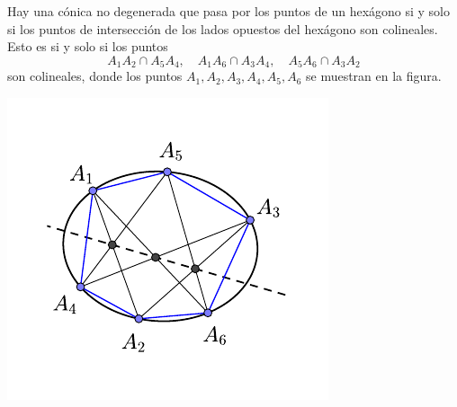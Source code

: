 \begin{theo}
	Hay una cónica no degenerada que pasa por los puntos de un hexágono si y solo si los puntos de intersección de los lados opuestos del hexágono son colineales. Esto es si y solo si los puntos
	\begin{equation}
		A_1A_2\cap A_5A_4, \quad A_1A_6\cap A_3A_4, \quad A_5A_6\cap A_3A_2
	\end{equation}
	son colineales, donde los puntos $A_1,A_2,A_3,A_4,A_5,A_6$ se muestran en la figura.
	\begin{center}
		\includegraphics[scale=1]{Graficos/Conicas/TeoremaPascal}
	\end{center}
\end{theo}
